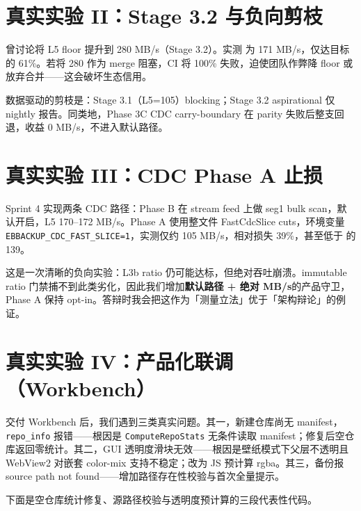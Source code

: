 \documentclass[11pt,a4paper,fontset=none]{ctexart}
\begin{document}
\section{真实实验 II：Stage 3.2 与负向剪枝}
\begin{say}
 曾讨论将 L5 floor 提升到 280 MB/s（Stage 3.2）。实测  为 171 MB/s，仅达目标的 61\%。若将 280 作为 merge 阻塞，CI 将 100\% 失败，迫使团队作弊降 floor 或放弃合并——这会破坏生态信用。

数据驱动的剪枝是：Stage 3.1（L5=105）blocking；Stage 3.2 aspirational 仅 nightly 报告。同类地，Phase 3C CDC carry-boundary 在 parity 失败后整支回退，收益 0 MB/s，不进入默认路径。
\end{say}

\section{真实实验 III：CDC Phase A 止损}
\begin{say}
Sprint 4 实现两条 CDC 路径：Phase B 在 stream feed 上做 seg1 bulk scan，默认开启，L5 170--172 MB/s。Phase A 使用整文件 FastCdcSlice cuts，环境变量 \texttt{EBBACKUP\_CDC\_FAST\_SLICE=1}，实测仅约 105 MB/s，相对损失 39\%，甚至低于  的 139。

这是一次清晰的负向实验：L3b ratio 仍可能达标，但绝对吞吐崩溃。immutable ratio 门禁捕不到此类劣化，因此我们增加\textbf{默认路径 + 绝对 MB/s}的产品守卫，Phase A 保持 opt-in。答辩时我会把这作为「测量立法」优于「架构辩论」的例证。
\end{say}

\section{真实实验 IV：产品化联调（Workbench）}

\begin{say}
 交付 Workbench 后，我们遇到三类真实问题。其一，新建仓库尚无 manifest，\texttt{repo\_info} 报错——根因是 \texttt{ComputeRepoStats} 无条件读取 manifest；修复后空仓库返回零统计。其二，GUI 透明度滑块无效——根因是壁纸模式下父层不透明且 WebView2 对嵌套 color-mix 支持不稳定；改为 JS 预计算 rgba。其三，备份报 source path not found——增加路径存在性校验与首次全量提示。

下面是空仓库统计修复、源路径校验与透明度预计算的三段代表性代码。
\end{say}
\showrepostats
\showrunbackup
\showpanelsurface
\end{document}
